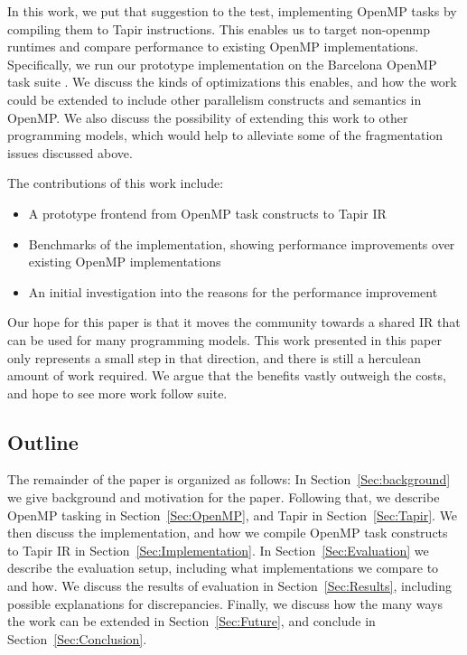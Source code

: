 \documentclass[sigconf]{acmart}
\begin{document}
In this work, we put that suggestion to the test, implementing OpenMP tasks by
compiling them to Tapir instructions. This enables us to target non-openmp
runtimes and compare performance to existing OpenMP implementations. Specifically,
we run our prototype implementation on the Barcelona OpenMP task suite
\cite{barcelona}. We discuss the kinds of optimizations this enables, and how
the work could be extended to include other parallelism constructs and semantics
in OpenMP. We also discuss the possibility of extending this work to other
programming models, which would help to alleviate some of the fragmentation
issues discussed above.

The contributions of this work include: 

\begin{itemize}
\item A prototype frontend from OpenMP task constructs to Tapir IR
\item Benchmarks of the implementation, showing performance improvements over
existing OpenMP implementations
\item An initial investigation into the reasons for the performance improvement
\end{itemize}

Our hope for this paper is that it moves the community towards a shared IR that
can be used for many programming models. This work presented in this paper only
represents a small step in that direction, and there is still a herculean amount
of work required. We argue that the benefits vastly outweigh the costs, and
hope to see more work follow suite. 

\subsection{Outline}

The remainder of the paper is organized as follows: In Section~\ref{Sec:background} 
we give background and motivation for the paper. Following that, we describe OpenMP
tasking in Section~\ref{Sec:OpenMP}, and Tapir in Section~\ref{Sec:Tapir}. We then 
discuss the implementation, and how we compile OpenMP task constructs to Tapir IR in
Section~\ref{Sec:Implementation}. In Section~\ref{Sec:Evaluation} we describe the 
evaluation setup, including what implementations we compare to and how. We discuss
the results of evaluation in Section~\ref{Sec:Results}, including possible
explanations for discrepancies. Finally, we discuss how the many ways the work can
be extended in Section~\ref{Sec:Future}, and conclude in Section~\ref{Sec:Conclusion}.
\end{document}
